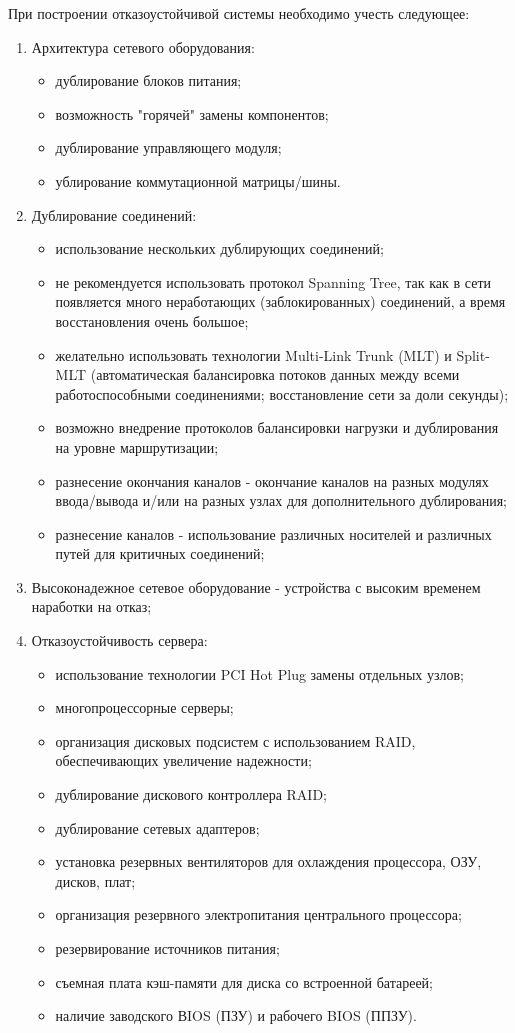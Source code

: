 При построении отказоустойчивой системы необходимо учесть следующее:
\begin{enumerate}
\item Архитектура сетевого оборудования:
    \begin{itemize}
    \item дублирование блоков питания;
    \item возможность "горячей" замены компонентов; 
    \item дублирование управляющего модуля; 
    \item ублирование коммутационной матрицы/шины.
    \end{itemize}
\item Дублирование соединений:
    \begin{itemize}
    \item использование нескольких дублирующих соединений; 
    \item не рекомендуется использовать протокол Spanning Tree, так как в сети появляется много неработающих (заблокированных) соединений, а время восстановления очень большое; 
    \item желательно использовать технологии Multi-Link Trunk (MLT) и Split-MLT (автоматическая балансировка потоков данных между всеми работоспособными соединениями; восстановление сети за доли секунды); 
    \item возможно внедрение протоколов балансировки нагрузки и дублирования на уровне маршрутизации;
    \item разнесение окончания каналов - окончание каналов на разных модулях ввода/вывода и/или на разных узлах для дополнительного дублирования;
    \item разнесение каналов - использование различных носителей и различных путей для критичных соединений;
    \end{itemize}
\item Высоконадежное сетевое оборудование - устройства с высоким временем наработки на отказ;
\item Отказоустойчивость сервера:
    \begin{itemize}
    \item использование технологии PCI Hot Plug замены отдельных узлов;
    \item многопроцессорные серверы;
    \item организация дисковых подсистем с использованием RAID, обеспечивающих увеличение надежности;
    \item дублирование дискового контроллера RAID;
    \item дублирование сетевых адаптеров;
    \item установка резервных вентиляторов для охлаждения процессора, ОЗУ, дисков, плат;
    \item организация резервного электропитания центрального процессора;
    \item резервирование источников питания;
    \item съемная плата кэш-памяти для диска со встроенной батареей;
    \item наличие заводского ВIOS (ПЗУ) и рабочего BIOS (ППЗУ).
    \end{itemize}
\end{enumerate}

